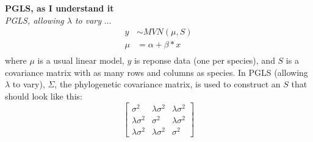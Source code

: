 \documentclass[11pt,letter]{article}
\begin{document}
\newpage
{\bf PGLS, as I understand it}\\

\emph{PGLS, allowing $\lambda$ to vary} ...\\

\begin{align}
y & \sim MVN(\mu, S)\\
\mu & = \alpha +  \beta*x \\
\end{align}
where $\mu$ is a usual linear model, $y$ is reponse data (one per species), and $S$ is a covariance matrix with as many rows and columns as species. In PGLS  (allowing $\lambda$ to vary), $\Sigma$, the phylogenetic covariance matrix, is used to construct an $S$ that should look like this:
\begin{equation}
 \begin{bmatrix}
  \sigma^2 &  \lambda \sigma^2 & \lambda \sigma^2 \\
  \lambda \sigma^2  & \sigma^2 & \lambda \sigma^2 \\
  \lambda \sigma^2 & \lambda \sigma^2 &   \sigma^2
 \end{bmatrix}
\end{equation}
\end{document}
